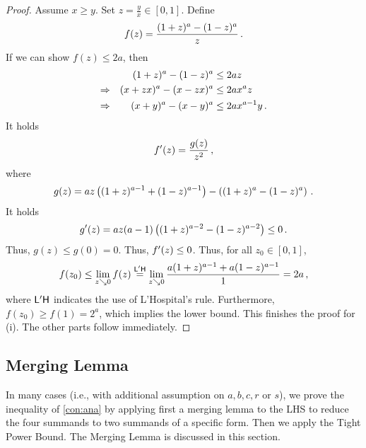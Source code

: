 \begin{proof}
	Assume $x\geq y$.
	Set $z = \frac yx \in[0,1]$. Define
	\begin{equation*}
		f(z) = \frac{(1+z)^a-(1-z)^a}{z}
		\, .
	\end{equation*}
	If we can show $f(z) \leq 2a$, then
	\begin{align*}
		&&(1+z)^a-(1-z)^a &\leq 2a z\\
		\Rightarrow && (x+zx)^a-(x-zx)^a &\leq 2a x^a z\\
		\Rightarrow && (x+y)^a-(x-y)^a &\leq 2a x^{a-1} y
		\, .
	\end{align*}
	It holds 
	\begin{equation*}
		f^\prime(z) = \frac {g(z)}{z^2}
		\, ,
	\end{equation*}
	where
	\begin{equation*}
		g(z) = az \left( (1+z)^{a-1}+(1-z)^{a-1} \right)-\left( (1+z)^{a}-(1-z)^{a} \right)
		\, .
	\end{equation*}
	It holds
	\begin{equation*}
		g^\prime(z) = az(a-1)\left( (1+z)^{a-2}-(1-z)^{a-2} \right) \leq 0\, .
	\end{equation*}
	Thus, $g(z)\leq g(0) = 0$.
	Thus, $f^\prime(z)\leq0$.
	Thus, for all $z_0 \in [0,1]$,
	\begin{equation*}
		f(z_0) 
		\leq 
		\lim_{z\searrow 0}f(z) 
		\stackrel{\mathsf{L'H}}{=} 
		\lim_{z\searrow 0}\frac{a(1+z)^{a-1}+a(1-z)^{a-1}}{1} 
		= 
		2a
		\, ,
	\end{equation*}
	where $\mathsf{L'H}$ indicates the use of L'Hospital's rule. 
	Furthermore, $f(z_0) \geq f(1) = 2^a$, which implies the lower bound. 
	This finishes the proof for (i). The other parts follow immediately.
\end{proof}
%
%
%
\subsection{Merging Lemma}\label{ssec:merginglemma}
%
In many cases (i.e., with additional assumption on $a,b,c,r$ or $s$), we prove the inequality of \autoref{con:ana} by applying first a merging lemma to the LHS to reduce the four summands to two summands of a specific form. Then we apply the Tight Power Bound. The Merging Lemma is discussed in this section.
%
